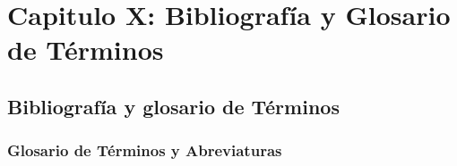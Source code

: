 \documentclass[12pt, a4paper, oneside]{book}
\begin{document}





\tableofcontents	%
\listoffigures		%
\listoftables		%
\mainmatter
\pagestyle{fancy}

















\thispagestyle{empty}


\chapter{\textbf{Capitulo X: Bibliografía y Glosario de Términos}}

\section{Bibliografía y glosario de Términos}

\subsection{Glosario de Términos y Abreviaturas}
\end{document}
